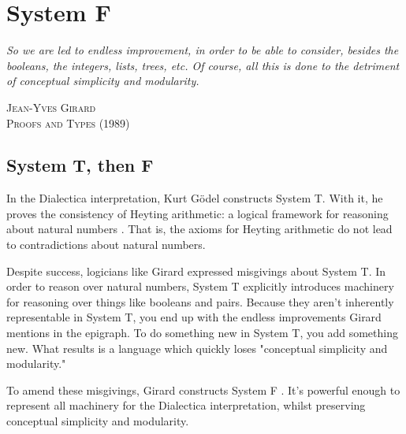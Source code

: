 \chapter{System F}




\begin{singlespace}
\setlength{\epigraphwidth}{0.6\textwidth}
\epigraph{\textit{So we are led to endless improvement, in order to be able to consider, besides the booleans, the integers, lists, trees, etc. Of course, all this is done to the detriment of conceptual simplicity and modularity.}}{\textsc{Jean-Yves Girard \\  Proofs and Types (1989)}}
\end{singlespace}

\section{System T, then F}
In the Dialectica interpretation, Kurt G{\"o}del constructs System T. With it, he proves the consistency of Heyting arithmetic: a logical framework for reasoning about natural numbers \cite{avigad1998godel}. That is, the axioms for Heyting arithmetic do not lead to contradictions about natural numbers. 

Despite success, logicians like Girard expressed misgivings about System T. In order to reason over natural numbers, System T explicitly introduces machinery for reasoning over things like booleans and pairs. Because they aren't inherently representable in System T, you end up with the endless improvements Girard mentions in the epigraph. To do something new in System T, you add something new. What results is a language which quickly loses "conceptual simplicity and modularity."

To amend these misgivings, Girard constructs System F \cite{girard1989proofs}. It's powerful enough to represent all machinery for the Dialectica interpretation, whilst preserving conceptual simplicity and modularity.

